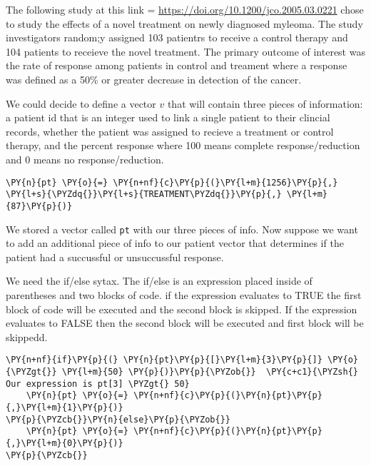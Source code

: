 The following study at this link = \url{https://doi.org/10.1200/jco.2005.03.0221}
chose to study the effects of a novel treatment on newly diagnosed
myleoma. The study investigators random;y assigned 103 patientrs to
receive a control therapy and 104 patients to receieve the novel
treatment. The primary outcome of interest was the rate of response
among patients in control and treament where a response was defined as a
50\% or greater decrease in detection of the cancer.

We could decide to define a vector \(v\) that will contain three pieces
of information: a patient id that is an integer used to link a single
patient to their clincial records, whether the patient was assigned to
recieve a treatment or control therapy, and the percent response where
100 means complete response/reduction and 0 means no response/reduction.

    \begin{tcolorbox}[breakable, size=fbox, boxrule=1pt, pad at break*=1mm,colback=cellbackground, colframe=cellborder]
\begin{Verbatim}[commandchars=\\\{\}]
\PY{n}{pt} \PY{o}{=} \PY{n+nf}{c}\PY{p}{(}\PY{l+m}{1256}\PY{p}{,} \PY{l+s}{\PYZdq{}}\PY{l+s}{TREATMENT\PYZdq{}}\PY{p}{,} \PY{l+m}{87}\PY{p}{)}
\end{Verbatim}
\end{tcolorbox}

    We stored a vector called \texttt{pt} with our three pieces of info. Now
suppose we want to add an additional piece of info to our patient vector
that determines if the patient had a succussful or unsuccussful
response.

We need the if/else sytax. The if/else is an expression placed inside of
parentheses and two blocks of code. if the expression evaluates to TRUE
the first block of code will be executed and the second block is
skipped. If the expression evaluates to FALSE then the second block will
be executed and first block will be skippedd.

    \begin{tcolorbox}[breakable, size=fbox, boxrule=1pt, pad at break*=1mm,colback=cellbackground, colframe=cellborder]
\begin{Verbatim}[commandchars=\\\{\}]
\PY{n+nf}{if}\PY{p}{(} \PY{n}{pt}\PY{p}{[}\PY{l+m}{3}\PY{p}{]} \PY{o}{\PYZgt{}} \PY{l+m}{50} \PY{p}{)}\PY{p}{\PYZob{}}  \PY{c+c1}{\PYZsh{} Our expression is pt[3] \PYZgt{} 50}
    \PY{n}{pt} \PY{o}{=} \PY{n+nf}{c}\PY{p}{(}\PY{n}{pt}\PY{p}{,}\PY{l+m}{1}\PY{p}{)}
\PY{p}{\PYZcb{}}\PY{n}{else}\PY{p}{\PYZob{}}
    \PY{n}{pt} \PY{o}{=} \PY{n+nf}{c}\PY{p}{(}\PY{n}{pt}\PY{p}{,}\PY{l+m}{0}\PY{p}{)}
\PY{p}{\PYZcb{}}
\end{Verbatim}
\end{tcolorbox}


